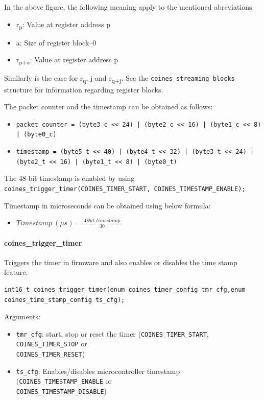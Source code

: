In the above figure, the following meaning apply to the mentioned abreviations:
\begin{itemize}
	\item r\textsubscript{p}: Value at register address p
	\item a: Size of register block–0
	\item r\textsubscript{p+a}: Value at register address p
\end{itemize}

Similarly is the case for r\textsubscript{q}, j and r\textsubscript{q+j}. See the \texttt{coines\_streaming\_blocks} structure for information regarding register blocks.

The packet counter and the timestamp can be obtained as follows:

\begin{itemize}
	\item[] \texttt{packet\_counter = (byte3\_c << 24) | (byte2\_c << 16) | (byte1\_c << 8) | (byte0\_c)}
	\item[] \texttt{timestamp = (byte5\_t << 40) | (byte4\_t << 32) | (byte3\_t << 24) | (byte2\_t << 16) | (byte1\_t << 8) | (byte0\_t)}
\end{itemize}

The 48-bit timestamp is enabled by using \\ \texttt{coines\_trigger\_timer(COINES\_TIMER\_START,  COINES\_TIMESTAMP\_ENABLE);}

Timestamp in microseconds can be obtained using below formula:
\begin{itemize}
	\item[] $\displaystyle Timestamp\ (\mu s) = \frac{48bit\_timestamp}{30}$
\end{itemize}

\paragraph{coines\_trigger\_timer}
Triggers the timer in firmware and also enables or disables the time stamp feature.

\begin{lstlisting}
int16_t coines_trigger_timer(enum coines_timer_config tmr_cfg,enum coines_time_stamp_config ts_cfg);
\end{lstlisting}

Arguments:
\begin{itemize}
	\item \texttt{tmr\_cfg}: start, stop or reset the timer (\texttt{COINES\_TIMER\_START}, \texttt{COINES\_TIMER\_STOP} or \\ \texttt{COINES\_TIMER\_RESET}) 
	\item \texttt{ts\_cfg}: Enables/disables microcontroller timestamp  (\texttt{COINES\_TIMESTAMP\_ENABLE} or \\ \texttt{COINES\_TIMESTAMP\_DISABLE}) 
\end{itemize}

